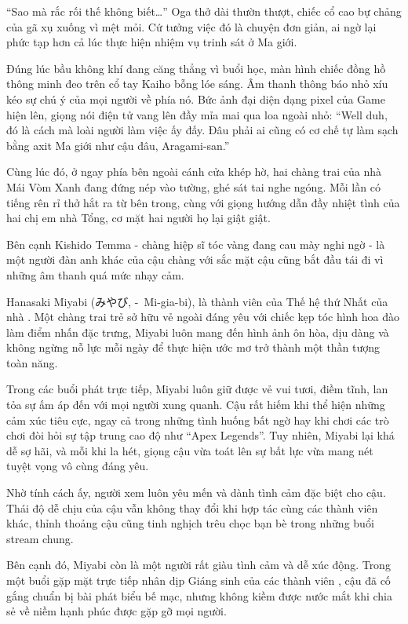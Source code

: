 \documentclass[../main.tex]{subfiles}
\begin{document}
``Sao mà rắc rối thế không biết\dots'' Oga thở dài thườn thượt, chiếc cổ cao bự chảng của gã xụ xuống vì mệt mỏi. Cứ tưởng việc đó là chuyện đơn giản, ai ngờ lại phức tạp hơn cả lúc thực hiện nhiệm vụ trinh sát ở Ma giới.

Đúng lúc bầu không khí đang căng thẳng vì buổi học, màn hình chiếc đồng hồ thông minh đeo trên cổ tay Kaiho bỗng lóe sáng. Âm thanh thông báo nhỏ xíu kéo sự chú ý của mọi người về phía nó. Bức ảnh đại diện dạng pixel của Game hiện lên, giọng nói điện tử vang lên đầy mỉa mai qua loa ngoài nhỏ: ``Well duh, đó là cách mà loài người làm việc ấy đấy. Đâu phải ai cũng có cơ chế tự làm sạch bằng axit Ma giới như cậu đâu, Aragami-san.''


Cùng lúc đó, ở ngay phía bên ngoài cánh cửa khép hờ, hai chàng trai của nhà Mái Vòm Xanh đang đứng nép vào tường, ghé sát tai nghe ngóng. Mỗi lần có tiếng rên rỉ thở hắt ra từ bên trong, cùng với giọng hướng dẫn đầy nhiệt tình của hai chị em nhà Tổng, cơ mặt hai người họ lại giật giật.

Bên cạnh Kishido Temma - chàng hiệp sĩ tóc vàng đang cau mày nghi ngờ - là một người đàn anh khác của cậu chàng với sắc mặt cậu cũng bắt đầu tái đi vì những âm thanh quá mức nhạy cảm.

\chrint

Hanasaki Miyabi (みやび, -\ Mi-gia-bi), là thành viên của Thế hệ thứ Nhất của nhà \hls. Một chàng trai trẻ sở hữu vẻ ngoài đáng yêu với chiếc kẹp tóc hình hoa đào làm điểm nhấn đặc trưng, Miyabi luôn mang đến hình ảnh ôn hòa, dịu dàng và không ngừng nỗ lực mỗi ngày để thực hiện ước mơ trở thành một thần tượng toàn năng.

Trong các buổi phát trực tiếp, Miyabi luôn giữ được vẻ vui tươi, điềm tĩnh, lan tỏa sự ấm áp đến với mọi người xung quanh. Cậu rất hiếm khi thể hiện những cảm xúc tiêu cực, ngay cả trong những tình huống bất ngờ hay khi chơi các trò chơi đòi hỏi sự tập trung cao độ như ``Apex Legends''. Tuy nhiên, Miyabi lại khá dễ sợ hãi, và mỗi khi la hét, giọng cậu vừa toát lên sự bất lực vừa mang nét tuyệt vọng vô cùng đáng yêu.

Nhờ tính cách ấy, người xem luôn yêu mến và dành tình cảm đặc biệt cho cậu. Thái độ dễ chịu của cậu vẫn không thay đổi khi hợp tác cùng các thành viên khác, thỉnh thoảng cậu cũng tinh nghịch trêu chọc bạn bè trong những buổi stream chung.

Bên cạnh đó, Miyabi còn là một người rất giàu tình cảm và dễ xúc động. Trong một buổi gặp mặt trực tiếp nhân dịp Giáng sinh của các thành viên \hls, cậu đã cố gắng chuẩn bị bài phát biểu bế mạc, nhưng không kiềm được nước mắt khi chia sẻ về niềm hạnh phúc được gặp gỡ mọi người.
\end{document}
